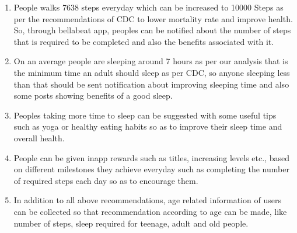 \documentclass[
]{article}
\providecommand{\tightlist}{%
  \setlength{\itemsep}{0pt}\setlength{\parskip}{0pt}}
\begin{document}
\begin{enumerate}
\def\labelenumi{\arabic{enumi})}
\tightlist
\item
  People walks 7638 steps everyday which can be increased to 10000 Steps
  as per the recommendations of CDC to lower mortality rate and improve
  health. So, through bellabeat app, peoples can be notified about the
  number of steps that is required to be completed and also the benefits
  associated with it.\\
\item
  On an average people are sleeping around 7 hours as per our analysis
  that is the minimum time an adult should sleep as per CDC, so anyone
  sleeping less than that should be sent notification about improving
  sleeping time and also some posts showing benefits of a good sleep.\\
\item
  Peoples taking more time to sleep can be suggested with some useful
  tips such as yoga or healthy eating habits so as to improve their
  sleep time and overall health.
\item
  People can be given inapp rewards such as titles, increasing levels
  etc., based on different milestones they achieve everyday such as
  completing the number of required steps each day so as to encourage
  them.\\
\item
  In addition to all above recommendations, age related information of
  users can be collected so that recommendation according to age can be
  made, like number of steps, sleep required for teenage, adult and old
  people.
\end{enumerate}
\end{document}
